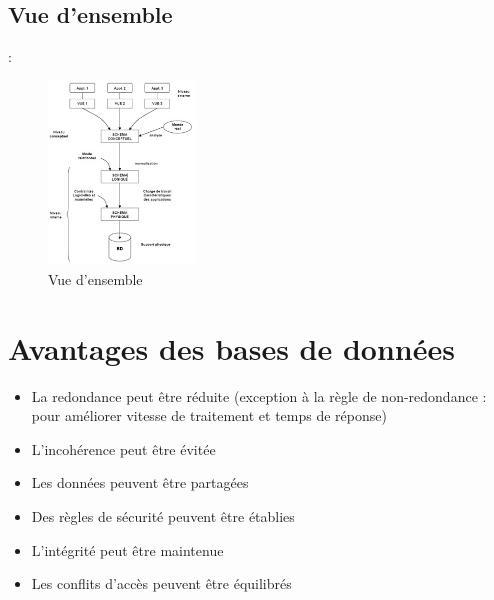 \documentclass[10pt]{beamer}
\begin{document}
\subsection{Vue d'ensemble}
\begin{frame}{\secname : \subsecname}
    \begin{figure}
        \begin{center}
            \includegraphics[width=0.35\textwidth]{../assets/img/architecture_sgbd--6.jpg}
            \caption{Vue d'ensemble}
            \label{Fig:architecture_sgbd--6}
        \end{center}
    \end{figure}
\end{frame}

\section{Avantages des bases de données}
\begin{frame}{\secname }
    \begin{itemize}
        \item La redondance peut être réduite (exception à la règle de non-redondance : pour améliorer vitesse de traitement et temps de réponse)
        \item L’incohérence peut être évitée
        \item Les données peuvent être partagées
        \item Des règles de sécurité peuvent être établies
        \item L’intégrité peut être maintenue
        \item Les conflits d’accès peuvent être équilibrés
    \end{itemize}
\end{frame}
\end{document}
